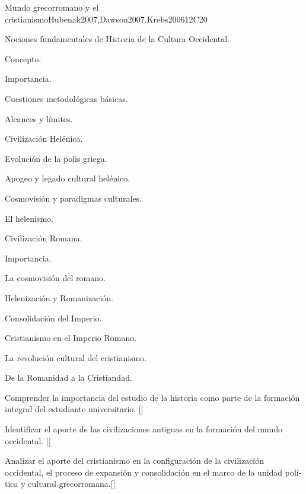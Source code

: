 \begin{syllabus}
\begin{unit}{}{Mundo grecorromano y el cristianismo}{Hubenak2007,Dawson2007,Krebs2006}{12}{C20}
\begin{topics}
	\item Nociones fundamentales de Historia de la Cultura Occidental.
	     \begin{subtopics}
		\item Concepto.
		\item Importancia.
		\item Cuestiones metodológicas básicas.
		\item Alcances y lí­mites.
	    \end{subtopics}
	\item Civilización Helénica.
	    \begin{subtopics}
		\item Evolución de la polis griega.
		\item Apogeo y legado cultural helénico.
		\item Cosmovisión y paradigmas culturales.
		\item El helenismo.
	    \end{subtopics}
	\item Civilización Romana.
	    \begin{subtopics}
		\item Importancia.
		\item La cosmovisión del romano.
		\item Helenización y Romanización.
		\item Consolidación del Imperio.
	    \end{subtopics}
	\item Cristianismo en el Imperio Romano.
	    \begin{subtopics}
		\item La revolución cultural del cristianismo.
		\item De la Romanidad a la Cristiandad.
	    \end{subtopics}
\end{topics}
\begin{learningoutcomes}
	\item Comprender la importancia del estudio de la historia como parte de la formación integral del estudiante universitario. [\Familiarity]
	\item Identificar el aporte de las civilizaciones antiguas en la formación del mundo occidental. [\Familiarity]
	\item Analizar el aporte del cristianismo en la configuración de la civilización occidental, el proceso de expansión y consolidación en el marco de la unidad polí­tica y cultural grecorromana.[\Familiarity]
\end{learningoutcomes}
\end{unit}


\end{syllabus}
